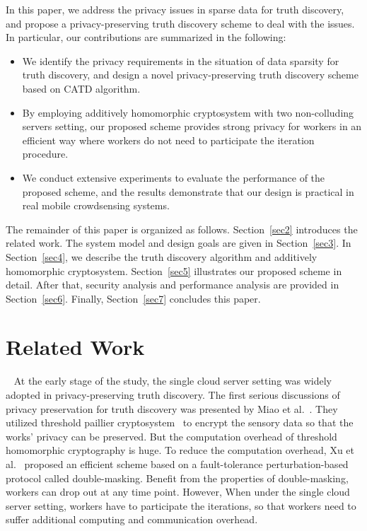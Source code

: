 \documentclass[conference]{IEEEtran}
\begin{document}
In this paper, we address the privacy issues in sparse data for truth discovery, and propose a privacy-preserving truth discovery scheme to deal with the issues.
In particular, our contributions are summarized in the following:
\begin{itemize}
  \item We identify the privacy requirements in the situation of data sparsity for truth discovery, and design a novel privacy-preserving truth discovery scheme based on CATD algorithm.
  \item By employing additively homomorphic cryptosystem with two non-colluding
servers setting, our proposed scheme provides strong privacy for workers in an efficient way where workers do not need to participate the iteration procedure.
  \item We conduct extensive experiments to evaluate the performance of the proposed scheme, and the results demonstrate that our design is practical in real mobile crowdsensing systems.
\end{itemize}

The remainder of this paper is organized as follows.
Section~\ref{sec2} introduces the related work.
The system model and design goals are given in Section~\ref{sec3}.
In Section~\ref{sec4}, we describe the truth discovery algorithm and additively homomorphic cryptosystem.
Section~\ref{sec5} illustrates our proposed scheme in detail.
After that, security analysis and performance analysis are provided in Section~\ref{sec6}.
Finally, Section~\ref{sec7} concludes this paper.

\section{Related Work}~\label{sec2}
At the early stage of the study, the single cloud server setting was widely adopted in privacy-preserving truth discovery.
The first serious discussions of privacy preservation for truth discovery was presented by Miao et al.~\cite{miao_cloud-enabled_2015}.
They utilized threshold paillier cryptosystem~\cite{damgard_generalisation_2001} to encrypt the sensory data so that the works' privacy can be preserved.
But the computation overhead of threshold homomorphic cryptography is huge.
To reduce the computation overhead, Xu et al.~\cite{xu_efficient_2019} proposed an efficient scheme based on a fault-tolerance perturbation-based protocol called double-masking.
Benefit from the properties of double-masking, workers can drop out at any time point.
However, 
When under the single cloud server setting, workers have to participate the iterations, so that workers need to suffer additional computing and communication overhead.
\end{document}
